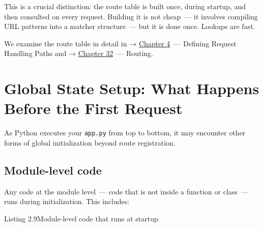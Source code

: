 This is a crucial distinction: the route table is built once, during startup, and then consulted on every request. Building it is not cheap~--- it involves compiling URL patterns into a matcher structure~--- but it is done once. Lookups are fast.

We examine the route table in detail in → \hyperref[ch:04-request-handling-paths]{Chapter 4}~--- Defining Request Handling Paths and → \hyperref[ch:32-routing]{Chapter 32}~--- Routing.

\setcounter{section}{5}
\section{Global State Setup: What Happens Before the First Request}\label{02-runtime-initialization:26-global-state-setup-what-happens-before-the-first-request}

As Python executes your \texttt{app.py} from top to bottom, it may encounter other forms of global initialization beyond route registration.

\subsection*{Module-level code}\label{02-runtime-initialization:module-level-code}

Any code at the module level~--- code that is not inside a function or class~--- runs during initialization. This includes:

\begin{codeboxcap}[short]{\textcolor{accent}{Listing 2.9}\enspace Module-level code that runs at startup}

\begin{Shaded}
\begin{Highlighting}[]

\OperatorTok{=}\NormalTok{)}

\OperatorTok{=}\NormalTok{, }\NormalTok{)}
\NormalTok{(}\SpecialCharTok{\{}\SpecialCharTok{\}}\NormalTok{)}

\NormalTok{(}\OperatorTok{=}\NormalTok{[}\NormalTok{])}
\OperatorTok{=}
\end{Highlighting}
\end{Shaded}

\end{codeboxcap}


